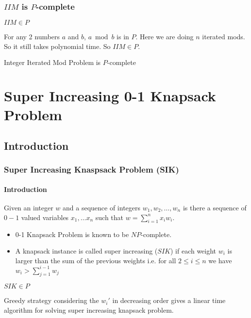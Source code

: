 \documentclass[article,8pt]{beamer}%
\begin{document}
\begin{frame}
	\frametitle{$IIM$ is $P$-complete}
	 \begin{theorem}
	 	$IIM\in P$
	 \end{theorem}
	 	For any 2 numbers $a$ and $b$, $a\bmod{b}$ is in $P$. Here we are doing $n$ iterated mods. So it still takes polynomial time. So $IIM\in P$.
	 	\vspace{5mm}
	 	
	\begin{theorem}
		Integer Iterated Mod Problem is $P$-complete
	\end{theorem}
\end{frame}
\section{Super Increasing 0-1 Knapsack Problem}
\subsection{Introduction}
\begin{frame}
\frametitle{Super Increasing Knaspsack Problem (SIK)}
\framesubtitle{Introduction}
\begin{definition}
	Given an integer $w$ and a sequence of integers $w_1,w_2,\dots, w_n$ is there a sequence of $0-1$ valued variables $x_1,\dots x_n$ such that $w=\sum\limits_{i=1}^n x_iw_i$.
\end{definition}
\begin{itemize}
	\item 0-1 Knapsack Problem is known to be $NP$-complete. \cite{guidetonpc}
	\item A knapsack instance is called super increasing ($SIK$) if each weight $w_i$ is larger than the sum of the previous weights i.e. for all $2\leq i\leq n$ we have $w_i>\sum\limits_{j=1}^{i-1}w_j$
\end{itemize}
\begin{theorem}
	$SIK\in P$
\end{theorem}
Greedy strategy considering the $w_i'$ in decreasing order gives a linear time algorithm for solving super increasing knapsack problem.
\end{frame}
\end{document}

